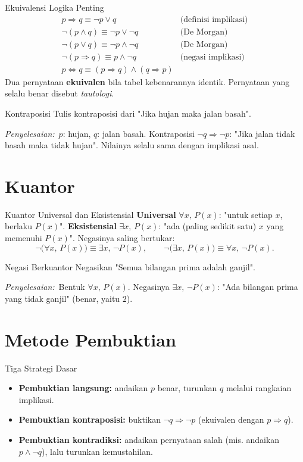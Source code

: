 \documentclass[11pt,a4paper]{report}
\theoremstyle{gaya}
\newcommand{\jawab}{\par\smallskip\noindent\textit{\textcolor{oranye}{Penyelesaian:}}\ }
\begin{document}
\begin{konsep}{Ekuivalensi Logika Penting}
\[
\begin{array}{ll}
p\Rightarrow q \equiv \lnot p\vee q & \text{(definisi implikasi)}\\
\lnot(p\wedge q)\equiv \lnot p\vee\lnot q & \text{(De Morgan)}\\
\lnot(p\vee q)\equiv \lnot p\wedge\lnot q & \text{(De Morgan)}\\
\lnot(p\Rightarrow q)\equiv p\wedge\lnot q & \text{(negasi implikasi)}\\
p\Leftrightarrow q \equiv (p\Rightarrow q)\wedge(q\Rightarrow p) &
\end{array}
\]
Dua pernyataan \textbf{ekuivalen} bila tabel kebenarannya identik. Pernyataan yang selalu benar disebut \emph{tautologi}.
\end{konsep}

\begin{contoh}{Kontraposisi}
Tulis kontraposisi dari "Jika hujan maka jalan basah".

\jawab $p$: hujan, $q$: jalan basah. Kontraposisi $\lnot q\Rightarrow\lnot p$: "Jika jalan tidak basah maka tidak hujan". Nilainya selalu sama dengan implikasi asal.
\end{contoh}

\section{Kuantor}
\begin{konsep}{Kuantor Universal dan Eksistensial}
\textbf{Universal} $\forall x,\,P(x)$: "untuk setiap $x$, berlaku $P(x)$". \textbf{Eksistensial} $\exists x,\,P(x)$: "ada (paling sedikit satu) $x$ yang memenuhi $P(x)$". Negasinya saling bertukar:
\[
\lnot\big(\forall x,\,P(x)\big)\equiv \exists x,\,\lnot P(x),\qquad
\lnot\big(\exists x,\,P(x)\big)\equiv \forall x,\,\lnot P(x).
\]
\end{konsep}

\begin{contoh}{Negasi Berkuantor}
Negasikan "Semua bilangan prima adalah ganjil".

\jawab Bentuk $\forall x,\,P(x)$. Negasinya $\exists x,\,\lnot P(x)$: "Ada bilangan prima yang tidak ganjil" (benar, yaitu $2$).
\end{contoh}

\section{Metode Pembuktian}
\begin{konsep}{Tiga Strategi Dasar}
\begin{itemize}[leftmargin=*,topsep=2pt]
  \item \textbf{Pembuktian langsung:} andaikan $p$ benar, turunkan $q$ melalui rangkaian implikasi.
  \item \textbf{Pembuktian kontraposisi:} buktikan $\lnot q\Rightarrow\lnot p$ (ekuivalen dengan $p\Rightarrow q$).
  \item \textbf{Pembuktian kontradiksi:} andaikan pernyataan salah (mis. andaikan $p\wedge\lnot q$), lalu turunkan kemustahilan.
\end{itemize}
\end{konsep}
\end{document}
